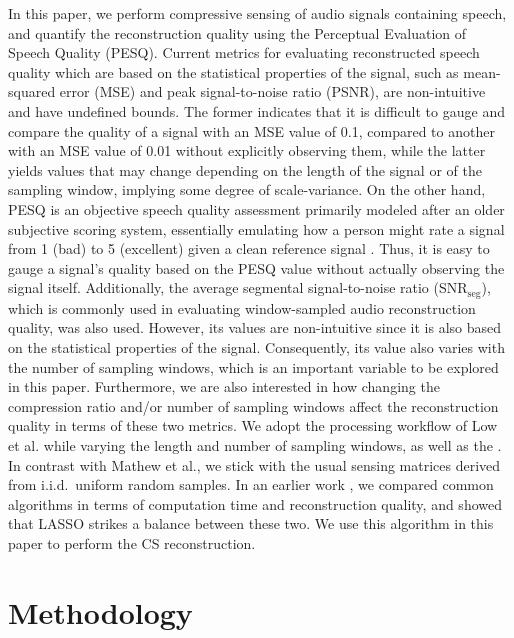 \documentclass[10pt,a4paper,twoside]{article}
\newcommand{\snrseg}{SNR$_{\mathrm{seg}}$}
\begin{document}
In this paper, we perform compressive sensing of audio signals containing speech, and quantify the reconstruction quality using the Perceptual Evaluation of Speech Quality (PESQ). Current metrics for evaluating reconstructed speech quality which are based on the statistical properties of the signal, such as mean-squared error (MSE) and peak signal-to-noise ratio (PSNR), are non-intuitive and have undefined bounds. The former indicates that it is difficult to gauge and compare the quality of a signal with an MSE value of 0.1, compared to another with an MSE value of 0.01 without explicitly observing them, while the latter yields values that may change depending on the length of the signal or of the sampling window, implying some degree of scale-variance. On the other hand, PESQ is an objective speech quality assessment primarily modeled after an older subjective scoring system, essentially emulating how a person might rate a signal from 1 (bad) to 5 (excellent) given a clean reference signal \cite{pesq}. Thus, it is easy to gauge a signal's quality based on the PESQ value without actually observing the signal itself. Additionally, the average segmental signal-to-noise ratio (\snrseg), which is commonly used in evaluating window-sampled audio reconstruction quality, was also used. However, its values are non-intuitive since it is also based on the statistical properties of the signal. Consequently, its value also varies with the number of sampling windows, which is an important variable to be explored in this paper. Furthermore, we are also interested in how changing the compression ratio  and/or number of sampling windows affect the reconstruction quality in terms of these two metrics. We adopt the processing workflow of Low et al. while varying the length and number of sampling windows, as well as the . In contrast with Mathew et al., we stick with the usual sensing matrices derived from i.i.d.~uniform random samples. In an earlier work \cite{Domingo2019}, we compared common algorithms in terms of computation time and reconstruction quality, and showed that LASSO strikes a balance between these two. We use this algorithm in this paper to perform the CS reconstruction.


\section{Methodology}\label{sec:metho}
\end{document}
